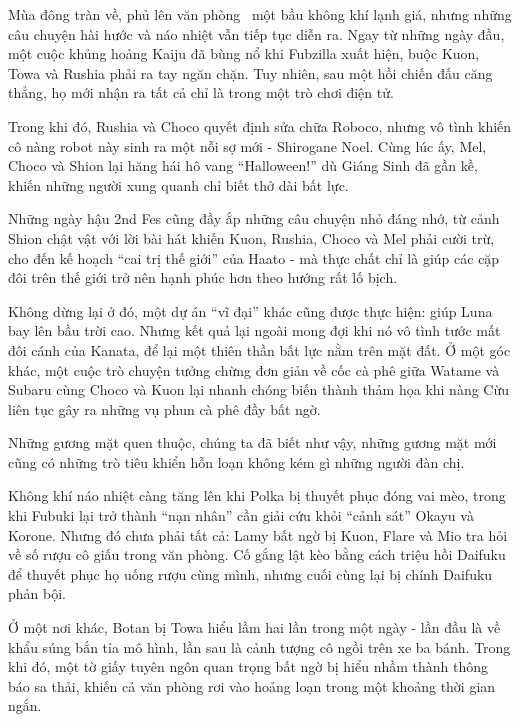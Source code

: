 \documentclass[main.tex]{subfiles}
\begin{document}
\color{black}

Mùa đông tràn về, phủ lên văn phòng \hll\ một bầu không khí lạnh giá, nhưng những câu chuyện hài hước và náo nhiệt vẫn tiếp tục diễn ra. Ngay từ những ngày đầu, một cuộc khủng hoảng Kaiju đã bùng nổ khi Fubzilla xuất hiện, buộc Kuon, Towa và Rushia phải ra tay ngăn chặn. Tuy nhiên, sau một hồi chiến đấu căng thẳng, họ mới nhận ra tất cả chỉ là trong một trò chơi điện tử.  

Trong khi đó, Rushia và Choco quyết định sửa chữa Roboco, nhưng vô tình khiến cô nàng robot này sinh ra một nỗi sợ mới - Shirogane Noel. Cùng lúc ấy, Mel, Choco và Shion lại hăng hái hô vang ``Halloween!'' dù Giáng Sinh đã gần kề, khiến những người xung quanh chỉ biết thở dài bất lực.  

Những ngày hậu 2nd Fes cũng đầy ắp những câu chuyện nhỏ đáng nhớ, từ cảnh Shion chật vật với lời bài hát khiến Kuon, Rushia, Choco và Mel phải cười trừ, cho đến kế hoạch ``cai trị thế giới'' của Haato - mà thực chất chỉ là giúp các cặp đôi trên thế giới trở nên hạnh phúc hơn theo hướng rất lố bịch.  

Không dừng lại ở đó, một dự án ``vĩ đại'' khác cũng được thực hiện: giúp Luna bay lên bầu trời cao. Nhưng kết quả lại ngoài mong đợi khi nó vô tình tước mất đôi cánh của Kanata, để lại một thiên thần bất lực nằm trên mặt đất. Ở một góc khác, một cuộc trò chuyện tưởng chừng đơn giản về cốc cà phê giữa Watame và Subaru cùng Choco và Kuon lại nhanh chóng biến thành thảm họa khi nàng Cừu liên tục gây ra những vụ phun cà phê đầy bất ngờ.  

Những gương mặt quen thuộc, chúng ta đã biết như vậy, những gương mặt mới cũng có những trò tiêu khiển hỗn loạn không kém gì những người đàn chị.

Không khí náo nhiệt càng tăng lên khi Polka bị thuyết phục đóng vai mèo, trong khi Fubuki lại trở thành ``nạn nhân'' cần giải cứu khỏi ``cảnh sát'' Okayu và Korone. Nhưng đó chưa phải tất cả: Lamy bất ngờ bị Kuon, Flare và Mio tra hỏi về số rượu cô giấu trong văn phòng. Cố gắng lật kèo bằng cách triệu hồi Daifuku để thuyết phục họ uống rượu cùng mình, nhưng cuối cùng lại bị chính Daifuku phản bội.  

Ở một nơi khác, Botan bị Towa hiểu lầm hai lần trong một ngày - lần đầu là về khẩu súng bắn tỉa mô hình, lần sau là cảnh tượng cô ngồi trên xe ba bánh. Trong khi đó, một tờ giấy tuyên ngôn quan trọng bất ngờ bị hiểu nhầm thành thông báo sa thải, khiến cả văn phòng rơi vào hoảng loạn trong một khoảng thời gian ngắn.  
\end{document}
